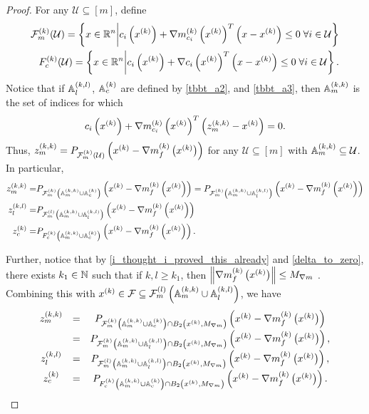 \begin{proof}

For any $\mathcal U \subseteq [m]$, define
\begin{align*}
\feasiblek(\mathcal U)  = \left\{x \in \Rn \bigg| c_i\left(\xk\right) + \gmcik^T\left(x - \xk\right) \le 0 \; \forall i \in \mathcal U \right\} \\
\truefeasiblek(\mathcal U)  = \left\{x \in \Rn \bigg| c_i\left(\xk\right) + \nabla c_i\left(\xk\right)^T\left(x - \xk\right) \le 0 \; \forall i \in \mathcal U \right\}.
\end{align*}
Notice that if $\Alk$, $\Ack$
are defined by
\cref{tbbt_a2}, and \cref{tbbt_a3},
then $\Amk$ is the set of indices for which 
\begin{align*}
c_i\left(\xk\right) + \gmcik^T\left(\zmk - \xk\right) = 0.
\end{align*}
Thus, $\zmk = P_{\feasiblek(\mathcal U)}\left(\xk - \gk\right)$ for any $\mathcal U \subseteq [m]$ with $\Amk \subseteq \mathcal U$.
In particular,
\begin{align*}
\zmk =& P_{\feasiblek\left(\Amk \cup \Ack\right)}\left(\xk - \gk\right) = P_{\feasiblek\left(\Amk \cup \Alk\right)}\left(\xk - \gk\right)\\
\zlk =& P_{\feasiblel\left(\Amk \cup \Alk\right)}\left(\xk - \gk\right) \\
\zck =& P_{\truefeasiblek\left(\Amk \cup \Ack\right)}\left(\xk - \gk\right).
\end{align*}

Further, notice that by \cref{i_thought_i_proved_this_already} and \cref{delta_to_zero}, there exists $k_1 \in \naturals$ such that if $k, l \ge k_1$, 
then
$\left\|\gk\right\| \le \maxmodelgrad$
.
Combining this with $\xk \in \feasible \subseteq \feasiblel\left(\Amk \cup \Alk\right)$, we have 
\begin{align}
\begin{array}{ccc}
\zmk &=& P_{\feasiblek\left(\Amk \cup \Ack\right) \cap B_2\left(\xk, \maxmodelgrad\right)}\left(\xk - \gk\right)  \\
     &=& P_{\feasiblek\left(\Amk \cup \Alk\right) \cap B_2\left(\xk, \maxmodelgrad\right)}\left(\xk - \gk\right), \\
\zlk &=& P_{\feasiblel\left(\Amk \cup \Alk\right) \cap B_2\left(\xk, \maxmodelgrad\right)}\left(\xk - \gk\right), \\
\zck &=& P_{\truefeasiblek\left(\Amk \cup \Ack\right) \cap B_2\left(\xk, \maxmodelgrad\right)}\left(\xk - \gk\right).
\end{array}\label{cbpt_eqn1}
\end{align}


\end{proof}
